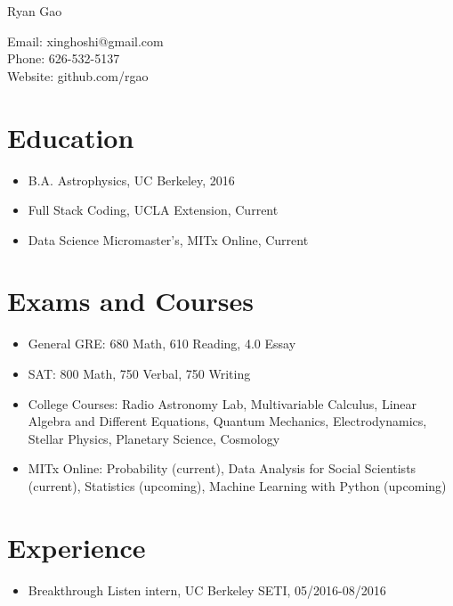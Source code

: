 \documentclass[letterpaper]{article}
\def\name{Ryan Gao}
\begin{document}
\centerline{\huge \name}

\vspace{0.25in}

\begin{center}
  \begin{minipage}{0.5\linewidth}
    \begin{center}
    Email: xinghoshi@gmail.com\\
    Phone: 626-532-5137\\
    Website: github.com/rgao
    \end{center}
\end{minipage}
\end{center}

\section*{Education}
\begin{itemize}
\item B.A. Astrophysics, UC Berkeley, 2016
\item Full Stack Coding, UCLA Extension, Current
\item Data Science Micromaster's, MITx Online, Current
\end{itemize}

\section*{Exams and Courses}
\begin{itemize}
\item General GRE: 680 Math, 610 Reading, 4.0 Essay
\item SAT: 800 Math, 750 Verbal, 750 Writing

\item College Courses: Radio Astronomy Lab, Multivariable Calculus, Linear Algebra and Different Equations, Quantum Mechanics, Electrodynamics, Stellar Physics, Planetary Science, Cosmology
\item MITx Online: Probability (current), Data Analysis for Social Scientists (current), Statistics (upcoming), Machine Learning with Python (upcoming)
\end{itemize}

\section*{Experience}
\begin{itemize}
\item Breakthrough Listen intern, UC Berkeley SETI, 05/2016-08/2016
\end{itemize}
\end{document}
